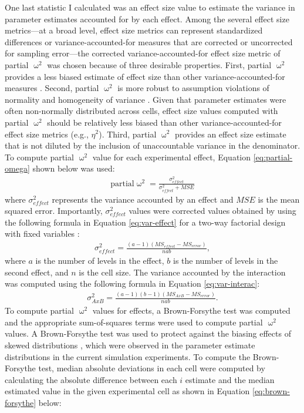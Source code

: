 \documentclass[
12pt, %
twoside,
english]{guelphthesis}
\begin{document}
One last statistic I calculated was an effect size value to estimate the variance in parameter estimates accounted for by each effect. Among the several effect size metrics---at a broad level, effect size metrics can represent standardized differences or variance-accounted-for measures that are corrected or uncorrected for sampling error---the corrected variance-accounted-for effect size metric of partial \(\upomega^2\) was chosen because of three desirable properties. First, partial \(\upomega^2\) provides a less biased estimate of effect size than other variance-accounted-for measures \autocite{okada2013}. Second, partial \(\upomega^2\) is more robust to assumption violations of normality and homogeneity of variance \autocite{yigit2018}. Given that parameter estimates were often non-normally distributed across cells, effect size values computed with partial \(\upomega^2\) should be relatively less biased than other variance-accounted-for effect size metrics (e.g., \(\eta^2\)). Third, partial \(\upomega^2\) provides an effect size estimate that is not diluted by the inclusion of unaccountable variance in the denominator. To compute partial \(\upomega^2\) value for each experimental effect, Equation \ref{eq:partial-omega} shown below was used:
\begin{align}
\text{partial} \upomega^2 = \frac{\sigma^2_{effect}}{\sigma^2_{effect} + MSE} 
\label{eq:partial-omega}
\end{align}
\noindent where \(\sigma^2_{effect}\) represents the variance accounted by an effect and \(MSE\) is the mean squared error. Importantly, \(\sigma^2_{effect}\) values were corrected values obtained by using the following formula in Equation \ref{eq:var-effect} for a two-way factorial design with fixed variables \autocite{howell2009}:
\begin{align}
 \sigma^2_{effect} = \frac{(a - 1)(MS_{effect} - MS_{error})}{nab},
\label{eq:var-effect}
\end{align}
\noindent where \(a\) is the number of levels in the effect, \(b\) is the number of levels in the second effect, and \(n\) is the cell size. The variance accounted by the interaction was computed using the following formula in Equation \ref{eq:var-interac}:
\begin{align}
 \sigma^2_{A x B} = \frac{(a - 1)(b-1)(MS_{AxB} - MS_{error})}{nab}. 
\label{eq:var-interac}
\end{align}
To compute partial \(\upomega^2\) values for effects, a Brown-Forsythe test was computed and the appropriate sum-of-squares terms were used to compute partial \(\upomega^2\) values. A Brown-Forsythe test was used to protect against the biasing effects of skewed distributions \autocite{brown1974}, which were observed in the parameter estimate distributions in the current simulation experiments. To compute the Brown-Forsythe test, median absolute deviations in each cell were computed by calculating the absolute difference between each \(i\) estimate and the median estimated value in the given experimental cell as shown in Equation \ref{eq:brown-forsythe} below:
\end{document}
